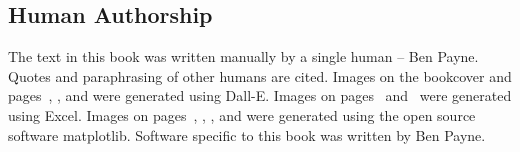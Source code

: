 \begin{center}
\section*{Human Authorship}
\end{center}

The text in this book was written manually by a single human -- Ben Payne. Quotes and paraphrasing of other humans are cited. Images on the bookcover and 
pages~\pageref{fig:subordinate_and_supervisor}, 
\pageref{fig:meeting-to-discuss-coordination}, and 
\pageref{fig:toaster_oven} were generated using Dall-E. Images on 
pages~\pageref{fig:pareto_frontier_cars} 
and~\pageref{fig:hours_per_year} were generated using Excel. Images on 
pages~\pageref{fig:task-distribution-tasks-per-person}, \pageref{fig:task-distribution-backlog-length}, 
\pageref{fig:task-distribution-percent-of-tasks}, and 
\pageref{fig:task-distribution-completed-vs-size} were generated using the open source software matplotlib. Software specific to this book was written by Ben Payne. 

